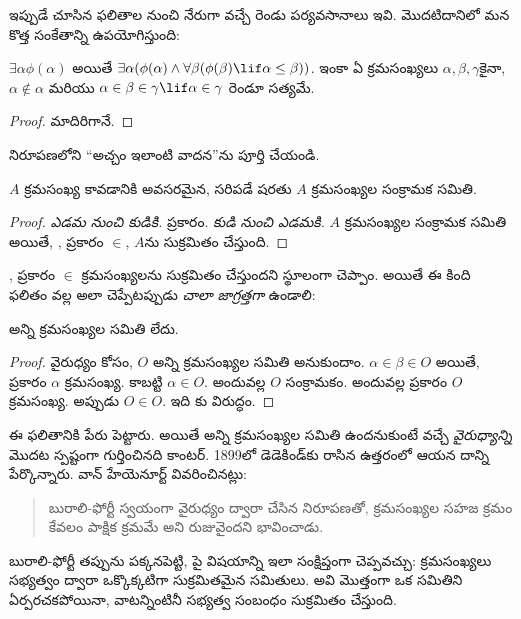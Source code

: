 \documentclass[../../../include/open-logic-section]{subfiles}
\begin{document}
ఇప్పుడే చూసిన ఫలితాల నుంచి నేరుగా వచ్చే రెండు
పర్యవసానాలు
ఇవి. మొదటిదానిలో మన
కొత్త సంకేతాన్ని
ఉపయోగిస్తుంది:

\begin{cor}
$\exists \alpha\phi(\alpha)$
అయితే
$\exists \alpha(\phi(\alpha)
\land \forall \beta(\phi(\beta) \lif \alpha \leq \beta))$.
ఇంకా ఏ క్రమసంఖ్యలు $\alpha, \beta, \gamma$కైనా,
$\alpha
\notin \alpha$ మరియు
$\alpha \in \beta \in \gamma \lif \alpha \in
\gamma$ రెండూ సత్యమే.
\end{cor}

\begin{proof}
మాదిరిగానే.
\end{proof}

\begin{prob}
నిరూపణలోని ``అచ్చం
ఇలాంటి వాదన''ను
పూర్తి చేయండి.
\end{prob}

\begin{cor}
$A$ క్రమసంఖ్య కావడానికి
అవసరమైన, సరిపడే షరతు $A$
క్రమసంఖ్యల సంక్రామక
సమితి.
\end{cor}

\begin{proof}
\emph{ఎడమ నుంచి కుడికి.}
ప్రకారం. \emph{కుడి నుంచి
ఎడమకి.} $A$ క్రమసంఖ్యల
సంక్రామక సమితి అయితే,
,
ప్రకారం $\in$, $A$ను
సుక్రమితం చేస్తుంది.
\end{proof}

,
 ప్రకారం
$\in$ క్రమసంఖ్యలను
సుక్రమితం చేస్తుందని
స్థూలంగా చెప్పాం.
అయితే ఈ కింది ఫలితం
వల్ల అలా చెప్పేటప్పుడు
\emph{చాలా జాగ్రత్తగా}
ఉండాలి:

\begin{thm}[బురాలి-ఫోర్టీ వైరుధ్యం]
అన్ని క్రమసంఖ్యల
సమితి లేదు.
\end{thm}

\begin{proof}
వైరుధ్యం కోసం,
$O$ అన్ని క్రమసంఖ్యల
సమితి అనుకుందాం.
$\alpha \in
\beta \in O$ అయితే,
ప్రకారం $\alpha$
క్రమసంఖ్య. కాబట్టి
$\alpha \in O$.
అందువల్ల $O$
సంక్రామకం. అందువల్ల
ప్రకారం $O$
క్రమసంఖ్య. అప్పుడు
$O \in O$. ఇది
కు
విరుద్ధం.
\end{proof}
\noindent
ఈ ఫలితానికి \citeauthor{Burali-Forti1897} పేరు పెట్టారు.
అయితే అన్ని క్రమసంఖ్యల సమితి ఉందనుకుంటే వచ్చే
\emph{వైరుధ్యాన్ని} మొదట స్పష్టంగా గుర్తించినది కాంటర్.
1899లో డెడెకిండ్‌కు రాసిన ఉత్తరంలో ఆయన దాన్ని పేర్కొన్నారు.
వాన్ హేయెనూర్ట్ వివరించినట్లు:
\begin{quote}
  బురాలి-ఫోర్టీ స్వయంగా
  వైరుధ్యం ద్వారా చేసిన నిరూపణతో,
  క్రమసంఖ్యల సహజ క్రమం
  కేవలం పాక్షిక క్రమమే
  అని రుజువైందని
  భావించాడు.
  \citep[p.~105]{Heijenoort1967}
\end{quote}
బురాలి-ఫోర్టీ తప్పును
పక్కనపెట్టి, పై విషయాన్ని
ఇలా సంక్షిప్తంగా చెప్పవచ్చు:
క్రమసంఖ్యలు సభ్యత్వం
ద్వారా ఒక్కొక్కటిగా
సుక్రమితమైన సమితులు.
అవి మొత్తంగా ఒక సమితిని
ఏర్పరచకపోయినా,
వాటన్నింటినీ సభ్యత్వ
సంబంధం సుక్రమితం చేస్తుంది.
\end{document}
